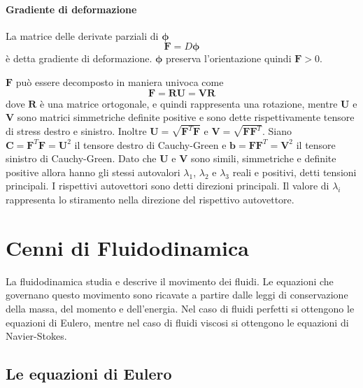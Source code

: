 \paragraph{Gradiente di deformazione}
La matrice delle derivate parziali di $\boldsymbol{\phi}$ 
$$ \mathbf{F} = D\boldsymbol{\phi}$$
è detta gradiente di deformazione.
$\boldsymbol{\phi}$ preserva l'orientazione quindi $\mathbf{F} > 0$. 

$\mathbf{F}$ può essere decomposto in maniera univoca come 
$$\mathbf{F}=\mathbf{R}\mathbf{U}=\mathbf{V}\mathbf{R}$$
dove $\mathbf{R}$ è una matrice ortogonale, e quindi rappresenta una rotazione, mentre $\mathbf{U}$ e $\mathbf{V}$ sono matrici simmetriche definite positive e sono dette rispettivamente tensore di stress destro e sinistro. 
Inoltre $\mathbf{U}=\sqrt{\mathbf{F}^T\mathbf{F}}$ e $\mathbf{V}=\sqrt{\mathbf{F}\mathbf{F}^T}$.
Siano $\mathbf{C}=\mathbf{F}^T\mathbf{F}=\mathbf{U}^2$ il tensore destro di Cauchy-Green e $\mathbf{b}=\mathbf{F}\mathbf{F}^T=\mathbf{V}^2$ il tensore sinistro di Cauchy-Green.
Dato che $\mathbf{U}$ e $\mathbf{V}$ sono simili, simmetriche e definite positive allora hanno gli stessi autovalori $\lambda_1$, $\lambda_2$ e $\lambda_3$ reali e positivi, detti tensioni principali. I rispettivi autovettori sono detti direzioni principali. Il valore di $\lambda_i$ rappresenta lo stiramento nella direzione del rispettivo autovettore.

\section{Cenni di Fluidodinamica}

La fluidodinamica studia e descrive il movimento dei fluidi. Le equazioni che governano questo movimento sono ricavate a partire dalle leggi di conservazione della massa, del momento e dell'energia. Nel caso di fluidi perfetti si ottengono le equazioni di Eulero, mentre nel caso di fluidi viscosi si ottengono le equazioni di Navier-Stokes.

\subsection{Le equazioni di Eulero}

